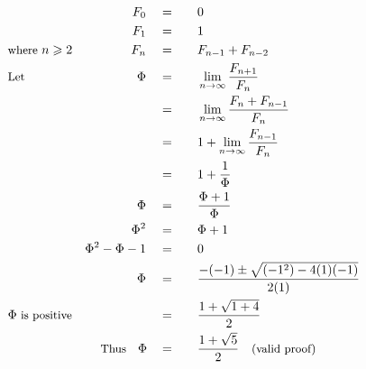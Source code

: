 \begin{alignat*}{5}
&\,&F_0\quad&=\quad&&0\\
&\,&F_1\quad&=&&1\\
&\small\text{where }n\geqslant2&F_n\quad&=&&F_{n-1}+F_{n-2}\\
&\small\text{Let }&\Phi\quad&=&&\lim_{n\to\infty}\frac{F_{n+1}}{F_n}\\
&\,&\,&=&&\lim_{n\to\infty}\frac{F_n+F_{n-1}}{F_n}\\
&\,&\,&=&&1+\lim_{n\to\infty}\frac{F_{n-1}}{F_n}\\
&\,&\,&=&&1+\frac{1}{\Phi}\\
&\,&\Phi\quad&=&&\frac{\Phi+1}{\Phi}\\
&\,&\Phi^2\quad&=&&\Phi+1\\
&\,&\Phi^2-\Phi-1\quad&=&&0\\
&\,&\Phi\quad&=&&\frac{-(-1)\pm\sqrt{(-1^2)-4(1)(-1)}}{2(1)}\\
&\Phi\small\text{ is positive}&\,&=&&\frac{1+\sqrt{1+4}}{2}\\
&\,&\small\text{Thus}\quad\Phi\quad&=&&\frac{1+\sqrt{5}}{2}\quad\small\text{(valid proof)}
\end{alignat*}
